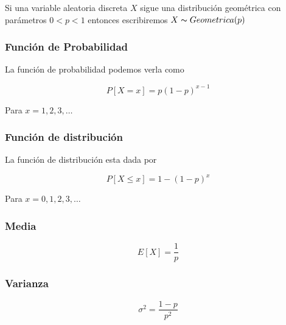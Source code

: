 \documentclass{article}
\begin{document}
            Si una variable aleatoria discreta $X$ sigue una distribución geométrica con parámetros $0<p<1$ entonces escribiremos $X\thicksim Geometrica (p)$ 

                 \subsubsection{Función de Probabilidad}

                    La función de probabilidad podemos verla como

                        \begin{equation*}
                            P[X=x]=p(1-p)^{x-1}
                        \end{equation*}

                    Para $x=1,2,3,\ldots$

                \subsubsection{Función de distribución }

                    La función de distribución esta dada por

                        \begin{equation*}
                            P[X\leq x]  = 1-(1-p)^x
                        \end{equation*}

                    Para $x=0,1,2,3,\ldots $

                \subsubsection{Media}

                            \begin{equation*}
                                E[X] = \frac{1}{p}
                            \end{equation*}
                
                \subsubsection{Varianza}

                    \begin{equation*}
                        \sigma ^2 = \frac{1-p}{p^2}
                    \end{equation*}
                    
\end{document}
